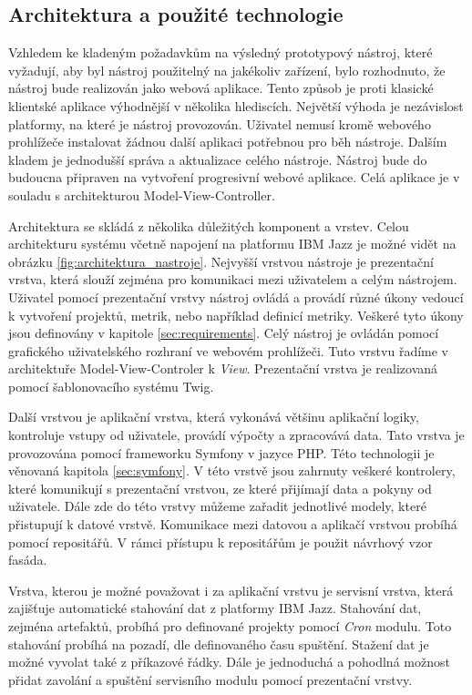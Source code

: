 \documentclass[czech,master,public,dept460,male,cpdeclaration,oneside]{diploma}
\begin{document}
\subsection{Architektura a použité technologie}
Vzhledem ke kladeným požadavkům na výsledný prototypový nástroj, které vyžadují, aby byl nástroj použitelný na jakékoliv zařízení, bylo rozhodnuto, že nástroj bude realizován jako webová aplikace. Tento způsob je proti klasické klientské aplikace výhodnější v několika hlediscích. Největší výhoda je nezávislost platformy, na které je nástroj provozován. Uživatel nemusí kromě webového prohlížeče instalovat žádnou další aplikaci potřebnou pro běh nástroje. Dalším kladem je jednodušší správa a aktualizace celého nástroje. Nástroj bude do budoucna připraven na vytvoření progresivní webové aplikace. Celá aplikace je v souladu s architekturou Model-View-Controller.

Architektura se skládá z několika důležitých komponent a vrstev. Celou architekturu systému včetně napojení na platformu IBM Jazz je možné vidět na obrázku \ref{fig:architektura_nastroje}. Nejvyšší vrstvou nástroje je prezentační vrstva, která slouží zejména pro komunikaci mezi uživatelem a celým nástrojem. Uživatel pomocí prezentační vrstvy nástroj ovládá a provádí různé úkony vedoucí k vytvoření projektů, metrik, nebo například definicí metriky. Veškeré tyto úkony jsou definovány v kapitole \ref{sec:requirements}. Celý nástroj je ovládán pomocí grafického uživatelského rozhraní ve webovém prohlížeči. Tuto vrstvu řadíme v architektuře Model-View-Controler k \textit{View}. Prezentační vrstva je realizovaná pomocí šablonovacího systému Twig.

Další vrstvou je aplikační vrstva, která vykonává většinu aplikační logiky, kontroluje vstupy od uživatele, provádí výpočty a zpracovává data. Tato vrstva je provozována pomocí frameworku Symfony v jazyce PHP. Této technologii je věnovaná kapitola \ref{sec:symfony}. V této vrstvě jsou zahrnuty veškeré kontrolery, které komunikují s prezentační vrstvou, ze které přijímají data a pokyny od uživatele. Dále zde do této vrstvy můžeme zařadit jednotlivé modely, které přistupují k datové vrstvě. Komunikace mezi datovou a aplikačí vrstvou probíhá pomocí repositářů. V rámci přístupu k repositářům je použit návrhový vzor fasáda. 

Vrstva, kterou je možné považovat i za aplikační vrstvu je servisní vrstva, která zajišťuje automatické stahování dat z platformy IBM Jazz. Stahování dat, zejména artefaktů, probíhá pro definované projekty pomocí \textit{Cron} modulu. Toto stahování probíhá na pozadí, dle definovaného času spuštění. Stažení dat je možné vyvolat také z příkazové řádky. Dále je jednoduchá a pohodlná možnost přidat zavolání a spuštění servisního modulu pomocí prezentační vrstvy.
\end{document}
